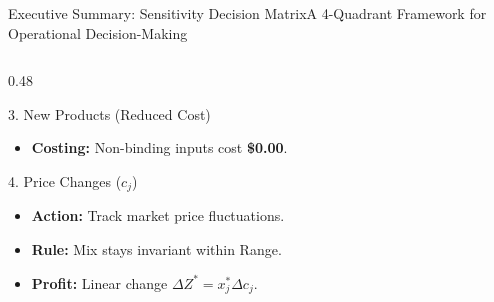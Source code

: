 \documentclass{beamer}
\begin{document}
\begin{frame}{Executive Summary: Sensitivity Decision Matrix}{A 4-Quadrant Framework for Operational Decision-Making}
\begin{columns}[T]
\begin{column}{0.48\textwidth}
\begin{exampleblock}{3. New Products (Reduced Cost)}
\begin{itemize}
                    \item \textbf{Costing:} Non-binding inputs cost \textbf{\$0.00}.
                \end{itemize}
            \end{exampleblock}
            \vspace{0.1em}
            \begin{block}{4. Price Changes ($c_j$)}
                \scriptsize
                \begin{itemize}\setlength{\itemsep}{0.1em}
                    \item \textbf{Action:} Track market price fluctuations.
                    \item \textbf{Rule:} Mix stays invariant within Range.
                    \item \textbf{Profit:} Linear change $\Delta Z^* = x_j^* \Delta c_j$.
                \end{itemize}
            \end{block}
        \end{column}
    \end{columns}
\end{frame}
\end{document}
